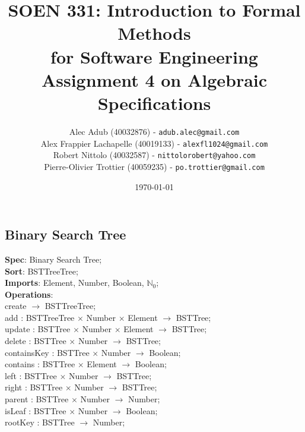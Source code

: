 \documentclass[12pt]{article}
\title{SOEN 331: Introduction to Formal Methods\\for Software Engineering\\
Assignment 4 on Algebraic Specifications}
\author{\begin{tabular}{c}
Alec Adub (40032876) - \texttt{adub.alec@gmail.com} \tabularnewline
Alex Frappier Lachapelle (40019133) - \texttt{alexfl1024@gmail.com} \tabularnewline
Robert Nittolo (40032587) - \texttt{nittolorobert@yahoo.com} \tabularnewline
Pierre-Olivier Trottier (40059235) - \texttt{po.trottier@gmail.com} \tabularnewline\\
\end{tabular}}
\date{\today}
\begin{document}
\begin{spacing}{1.5}

\maketitle

\newpage

\section*{Binary Search Tree}

\noindent \textbf{Spec}: Binary Search Tree;\\
\noindent \textbf{Sort}: BSTTreeTree;\\
\noindent \textbf{Imports}: Element, Number, Boolean, $\mathbb{N}_0$;\\
\noindent \textbf{Operations}:\\
\hspace*{5mm} create $\rightarrow$ BSTTreeTree;\\
\hspace*{5mm} add : BSTTreeTree $\times$ Number $\times$ Element $\rightarrow$ BSTTree;\\
\hspace*{5mm} update : BSTTree $\times$ Number $\times$ Element $\rightarrow$ BSTTree;\\
\hspace*{5mm} delete : BSTTree $\times$ Number $\rightarrow$ BSTTree;\\
\hspace*{5mm} containsKey :  BSTTree $\times$ Number $\rightarrow$ Boolean;\\
\hspace*{5mm} contains : BSTTree $\times$ Element $\rightarrow$ Boolean;\\
\hspace*{5mm} left : BSTTree $\times$ Number $\rightarrow$ BSTTree;\\
\hspace*{5mm} right : BSTTree $\times$ Number $\rightarrow$ BSTTree;\\
\hspace*{5mm} parent : BSTTree $\times$ Number $\rightarrow$ Number;\\
\hspace*{5mm} isLeaf : BSTTree $\times$ Number $\rightarrow$ Boolean;\\
\hspace*{5mm} rootKey : BSTTree $\rightarrow$ Number;\\

\end{spacing}
\end{document}
